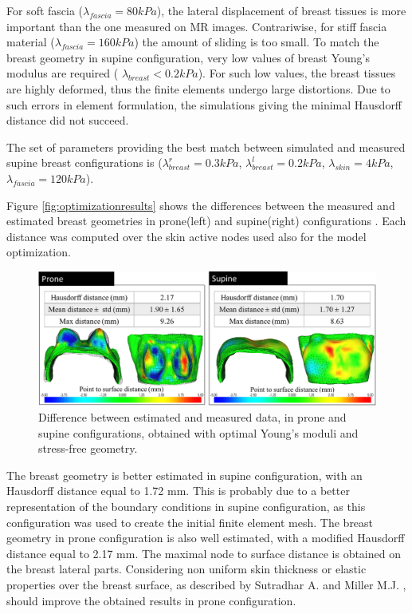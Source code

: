 

For soft fascia ($\lambda_{fascia} = 80kPa$), the lateral displacement of breast tissues is more important than the one measured on MR images. Contrariwise, for stiff fascia material ($\lambda_{fascia}=160 kPa$) the amount of sliding is too small. To match the breast geometry in supine configuration, very low values of breast Young's modulus are required ( $\lambda_{breast}< 0.2kPa$). For such low values, the breast tissues are highly deformed, thus the finite elements undergo large distortions. Due to such errors in element formulation, the simulations giving the minimal Hausdorff distance did not succeed.   

The set of parameters providing the best match between simulated and measured supine breast configurations is ($\lambda_{breast}^r=0.3 kPa$, $\lambda_{breast}^l=0.2 kPa$, $\lambda_{skin}=4 kPa$, $\lambda_{fascia}=120 kPa$).  

Figure \ref{fig:optimizationresults} shows the differences between the measured and estimated breast geometries in prone(left) and supine(right) configurations . Each distance was computed over the skin active nodes used also for the model optimization. 

\begin{figure}[!h]
\centering
\includegraphics[width=\textwidth,keepaspectratio]{figures/optimizationresults.png} 
\caption{Difference  between estimated and measured data, in prone and supine configurations, obtained with optimal Young's moduli and stress-free geometry. }\label{fig:geometryoptimizationresults}
\end{figure}

The breast geometry is better estimated in supine configuration, with an Hausdorff distance equal to 1.72 mm. This is probably due to a better representation of the boundary conditions in supine configuration, as this configuration was used to create the initial finite element mesh. The breast geometry in prone configuration is also well estimated, with a modified Hausdorff distance equal to 2.17 mm. The maximal node to surface distance is obtained on the breast lateral parts.  Considering non uniform skin thickness or elastic properties over the breast surface, as described by Sutradhar A. and Miller M.J. \citep{sutradhar_vivo_2013}, should improve the obtained results in prone configuration. 




